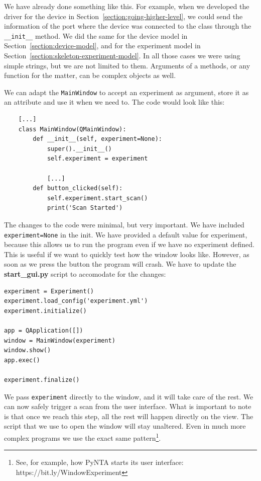 We have already done something like this. For example, when we developed the driver for the device in Section~\ref{section:going-higher-level}, we could send the information of the port where the device was connected to the class through the \texttt{\_\_init\_\_} method. We did the same for the device model in Section~\ref{section:device-model}, and for the experiment model in Section~\ref{section:skeleton-experiment-model}. In all those cases we were using simple strings, but we are not limited to them. Arguments of a methods, or any function for the matter, can be complex objects as well.

We can adapt the \texttt{MainWindow} to accept an experiment as argument, store it as an attribute and use it when we need to. The code would look like this:

\begin{verbatim}
    [...]
    class MainWindow(QMainWindow):
        def __init__(self, experiment=None):
            super().__init__()
            self.experiment = experiment

            [...]
        def button_clicked(self):
            self.experiment.start_scan()
            print('Scan Started')
\end{verbatim}

The changes to the code were minimal, but very important. We have included \texttt{experiment=None} in the init. We have provided a default value for experiment, because this allows us to run the program even if we have no experiment defined. This is useful if we want to quickly test how the window looks like. However, as soon as we press the button the program will crash. We have to update the \textbf{start\_gui.py} script to accomodate for the changes:

\begin{verbatim}
experiment = Experiment()
experiment.load_config('experiment.yml')
experiment.initialize()

app = QApplication([])
window = MainWindow(experiment)
window.show()
app.exec()

experiment.finalize()
\end{verbatim}

We pass \texttt{experiment} directly to the window, and it will take care of the rest. We can now safely trigger a scan from the user interface. What is important to note is that once we reach this step, all the rest will happen directly on the view. The script that we use to open the window will stay unaltered. Even in much more complex programs we use the exact same pattern\footnote{See, for example, how PyNTA starts its user interface: https://bit.ly/WindowExperiment}.

